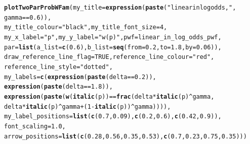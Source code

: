 \documentclass{article}\usepackage[]{graphicx}\usepackage[]{color}
\makeatletter
\newcommand{\hlnum}[1]{\textcolor[rgb]{0.686,0.059,0.569}{#1}}%
\newcommand{\hlstr}[1]{\textcolor[rgb]{0.192,0.494,0.8}{#1}}%
\newcommand{\hlopt}[1]{\textcolor[rgb]{0,0,0}{#1}}%
\newcommand{\hlstd}[1]{\textcolor[rgb]{0.345,0.345,0.345}{#1}}%
\newcommand{\hlkwc}[1]{\textcolor[rgb]{0.333,0.667,0.333}{#1}}%
\newcommand{\hlkwd}[1]{\textcolor[rgb]{0.737,0.353,0.396}{\textbf{#1}}}%
\newenvironment{kframe}{%
 \def\at@end@of@kframe{}%
 \ifinner\ifhmode%
  \def\at@end@of@kframe{\end{minipage}}%
  \begin{minipage}{\columnwidth}%
 \fi\fi%
 \def\FrameCommand##1{\hskip\@totalleftmargin \hskip-\fboxsep
 \colorbox{shadecolor}{##1}\hskip-\fboxsep
     \hskip-\linewidth \hskip-\@totalleftmargin \hskip\columnwidth}%
 \MakeFramed {\advance\hsize-\width
   \@totalleftmargin\z@ \linewidth\hsize
   \@setminipage}}%
 {\par\unskip\endMakeFramed%
 \at@end@of@kframe}
\newenvironment{knitrout}{}{} %
\makeatother
\begin{document}
\begin{knitrout}
\color{fgcolor}\begin{kframe}
\begin{alltt}
\hlkwd{plotTwoParProbWFam}\hlstd{(}\hlkwc{my_title}\hlstd{=}\hlkwd{expression}\hlstd{(}\hlkwd{paste}\hlstd{(}\hlstr{"linear in log odds,  "}\hlstd{,}
        \hlstd{gamma} \hlopt{==} \hlnum{0.6}\hlstd{)),}
        \hlkwc{my_title_colour}\hlstd{=}\hlstr{"black"}\hlstd{,} \hlkwc{my_title_font_size}\hlstd{=}\hlnum{4}\hlstd{,}
        \hlkwc{my_x_label} \hlstd{=} \hlstr{"p"}\hlstd{,} \hlkwc{my_y_label} \hlstd{=} \hlstr{"w(p)"}\hlstd{,} \hlkwc{pwf}\hlstd{=linear_in_log_odds_pwf,}
        \hlkwc{par}\hlstd{=}\hlkwd{list}\hlstd{(}\hlkwc{a_list}\hlstd{=}\hlkwd{c}\hlstd{(}\hlnum{0.6}\hlstd{),} \hlkwc{b_list}\hlstd{=}\hlkwd{seq}\hlstd{(}\hlkwc{from}\hlstd{=}\hlnum{0.2}\hlstd{,} \hlkwc{to}\hlstd{=}\hlnum{1.8}\hlstd{,} \hlkwc{by}\hlstd{=}\hlnum{0.06}\hlstd{)),}
        \hlkwc{draw_reference_line_flag}\hlstd{=}\hlnum{TRUE}\hlstd{,} \hlkwc{reference_line_colour}\hlstd{=}\hlstr{"red"}\hlstd{,}
        \hlkwc{reference_line_style}\hlstd{=}\hlstr{"dotted"}\hlstd{,}
        \hlkwc{my_labels}\hlstd{=}\hlkwd{c}\hlstd{(}\hlkwd{expression}\hlstd{(}\hlkwd{paste}\hlstd{(delta} \hlopt{==} \hlnum{0.2}\hlstd{)),}
                \hlkwd{expression}\hlstd{(}\hlkwd{paste}\hlstd{(delta} \hlopt{==} \hlnum{1.8}\hlstd{)),}
                \hlkwd{expression}\hlstd{(}\hlkwd{paste}\hlstd{(}\hlkwd{w}\hlstd{(}\hlkwd{italic}\hlstd{(p))} \hlopt{==} \hlkwd{frac}\hlstd{(delta} \hlopt{*} \hlkwd{italic}\hlstd{(p)}\hlopt{^}\hlstd{gamma,}
                        \hlstd{delta} \hlopt{*} \hlkwd{italic}\hlstd{(p)}\hlopt{^}\hlstd{gamma} \hlopt{+} \hlstd{(}\hlnum{1}\hlopt{-}\hlkwd{italic}\hlstd{(p))}\hlopt{^}\hlstd{gamma)))),}
        \hlkwc{my_label_positions}\hlstd{=}\hlkwd{list}\hlstd{(}\hlkwd{c}\hlstd{(}\hlnum{0.7}\hlstd{,}\hlnum{0.09}\hlstd{),}\hlkwd{c}\hlstd{(}\hlnum{0.2}\hlstd{,}\hlnum{0.6}\hlstd{),}\hlkwd{c}\hlstd{(}\hlnum{0.42}\hlstd{,} \hlnum{0.9}\hlstd{)),}
        \hlkwc{font_scaling}\hlstd{=}\hlnum{1.0}\hlstd{,}
        \hlkwc{arrow_positions} \hlstd{=} \hlkwd{list}\hlstd{(}\hlkwd{c}\hlstd{(}\hlnum{0.28}\hlstd{,}\hlnum{0.56}\hlstd{,}\hlnum{0.35}\hlstd{,}\hlnum{0.53}\hlstd{),}\hlkwd{c}\hlstd{(}\hlnum{0.7}\hlstd{,}\hlnum{0.23}\hlstd{,}\hlnum{0.75}\hlstd{,}\hlnum{0.35}\hlstd{)))}
\end{alltt}
\end{kframe}


\end{knitrout}
\end{document}
